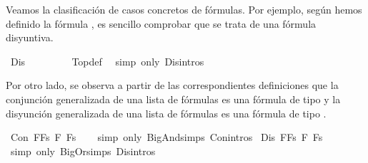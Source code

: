 \begin{isabellebody}
\begin{isamarkuptext}
  Veamos la clasificación de casos concretos de fórmulas. Por ejemplo, según hemos definido la 
  fórmula \isa{{\isasymtop}}, es sencillo comprobar que se trata de una fórmula disyuntiva.%
\end{isamarkuptext}\isamarkuptrue%
\isamarkupfalse%
\ {\isachardoublequoteopen}Dis\ {\isasymtop}\ {\isacharparenleft}\isactrlbold {\isasymnot}\ {\isasymbottom}{\isacharparenright}\ {\isasymbottom}{\isachardoublequoteclose}\ \isanewline
%
\isadelimproof
\ \ %
\endisadelimproof
%
\isatagproof
{}\isamarkupfalse%
\ Top{\isacharunderscore}def\ \isamarkupfalse%
\ {\isacharparenleft}simp\ only{\isacharcolon}\ Dis{\isachardot}intros{\isacharparenleft}{}{\isacharparenright}{\isacharparenright}%
\endisatagproof
{\isafoldproof}%
%
\isadelimproof
%
\endisadelimproof
%
\begin{isamarkuptext}%
Por otro lado, se observa a partir de las correspondientes definiciones que la conjunción
  generalizada de una lista de fórmulas es una fórmula de tipo \isa{{\isasymalpha}} y la disyunción generalizada de
  una lista de fórmulas es una fórmula de tipo \isa{{\isasymbeta}}.%
\end{isamarkuptext}\isamarkuptrue%
\isamarkupfalse%
\ {\isachardoublequoteopen}Con\ {\isacharparenleft}\isactrlbold {\isasymAnd}{\isacharparenleft}F{\isacharhash}Fs{\isacharparenright}{\isacharparenright}\ F\ {\isacharparenleft}\isactrlbold {\isasymAnd}Fs{\isacharparenright}{\isachardoublequoteclose}\isanewline
%
\isadelimproof
\ \ %
\endisadelimproof
%
\isatagproof
{}\isamarkupfalse%
\ {\isacharparenleft}simp\ only{\isacharcolon}\ BigAnd{\isachardot}simps\ Con{\isachardot}intros{\isacharparenleft}{}{\isacharparenright}{\isacharparenright}%
\endisatagproof
{\isafoldproof}%
%
\isadelimproof
\isanewline
%
\endisadelimproof
\isanewline
{}\isamarkupfalse%
\ {\isachardoublequoteopen}Dis\ {\isacharparenleft}\isactrlbold {\isasymOr}{\isacharparenleft}F{\isacharhash}Fs{\isacharparenright}{\isacharparenright}\ F\ {\isacharparenleft}\isactrlbold {\isasymOr}Fs{\isacharparenright}{\isachardoublequoteclose}\isanewline
%
\isadelimproof
\ \ %
\endisadelimproof
%
\isatagproof
{}\isamarkupfalse%
\ {\isacharparenleft}simp\ only{\isacharcolon}\ BigOr{\isachardot}simps\ Dis{\isachardot}intros{\isacharparenleft}{}{\isacharparenright}{\isacharparenright}%
\endisatagproof
{\isafoldproof}%
%
\isadelimproof
%
\endisadelimproof
%
\begin{isamarkuptext}%

\end{isamarkuptext}
\end{isabellebody}
